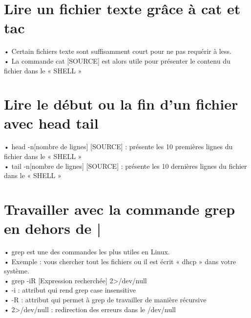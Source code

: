 \documentclass[a4paper, 11pt, french, oneside]{book}
\begin{document}
		\section{Lire un fichier texte grâce à cat et tac} 
			• Certain fichiers texte sont suffisamment court pour ne pas requérir à less.\\
		    • La commande cat [SOURCE] est alors utile pour présenter le contenu du fichier dans le « SHELL »\\
		\section{Lire le début ou la fin d’un fichier avec head tail} 
			• head -n[nombre de lignes] [SOURCE] : présente les 10 premières lignes du fichier dans le « SHELL »\\
		    • tail -n[nombre de lignes] [SOURCE] : présente les 10 dernières lignes du fichier dans le « SHELL »
		\section{Travailler avec la commande grep en dehors de |} 
			• grep est une des commandes les plus utiles en Linux.\\
		    • Exemple : vous chercher tout les fichiers ou il est écrit « dhcp » dans votre système.\\
		    • grep -iR [Expression recherchée] 2>/dev/null\\
		    • -i : attribut qui rend grep case insensitive\\
		    • -R : attribut qui permet à grep de travailler de manière récursive\\
		    • 2>/dev/null : redirection des erreurs dans le /dev/null\\
\end{document}
